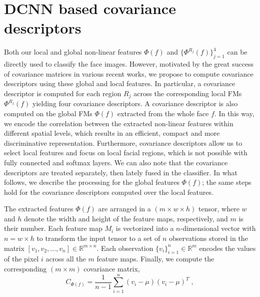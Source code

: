 \documentclass{bmvc2k}
\begin{document}
\section{DCNN based covariance descriptors}\label{sect:dcnn-covariance}
Both our local and global non-linear features $\Phi(f)$ and $\{\Phi^{R_{j}}(f)\}_{j=1}^{4}$ can be directly used to classify the face images. However, motivated by the great success of covariance matrices in various recent works, we propose to compute covariance descriptors using these global and local features. In particular, a covariance descriptor is computed for each region $R_{j}$ across the corresponding local FMs $\Phi^{R_{j}}(f)$ yielding four covariance descriptors. A covariance descriptor is also computed on the global FMs $\Phi(f)$ extracted from the whole face $f$. 
In this way, we encode the correlation between the extracted non-linear features within different spatial levels, which results in an efficient, compact and more discriminative representation. Furthermore, covariance descriptors allow us to select local features and focus on local facial regions, which is not possible with fully connected and softmax layers. We can also note that the covariance descriptors are treated separately, then lately fused in the classifier. In what follows, we describe the processing for the global features $\Phi(f)$; the same steps hold for the covariance descriptors computed over the local features.

The extracted features $\Phi(f)$ are arranged in a $(m \times w \times h )$ tensor, where $w$ and $h$ denote the width and height of the feature maps, respectively, and $m$ is their number. Each feature map $M_i$ is vectorized into a $n$-dimensional vector with $n=w\times h$ to transform the input tensor to a set of $n$ observations stored in the matrix $[v_{1}, v_{2},...,v_{n}] \in \mathbb{R}^{m \times n}$. Each observation $\{v_i\}^n_{i=1} \in \mathbb{R}^{m}$ encodes the values of the pixel $i$ across all the $m$ feature maps. Finally, we compute the corresponding $(m\times m)$ covariance matrix, 
%
\begin{equation}
\label{eq:covariance}
C_{\Phi(f)} = \dfrac{1}{n-1}\sum^{n}_{i=1} (v_{i}-\mu)(v_{i}-\mu)^{T} \; ,
\end{equation}
\end{document}
